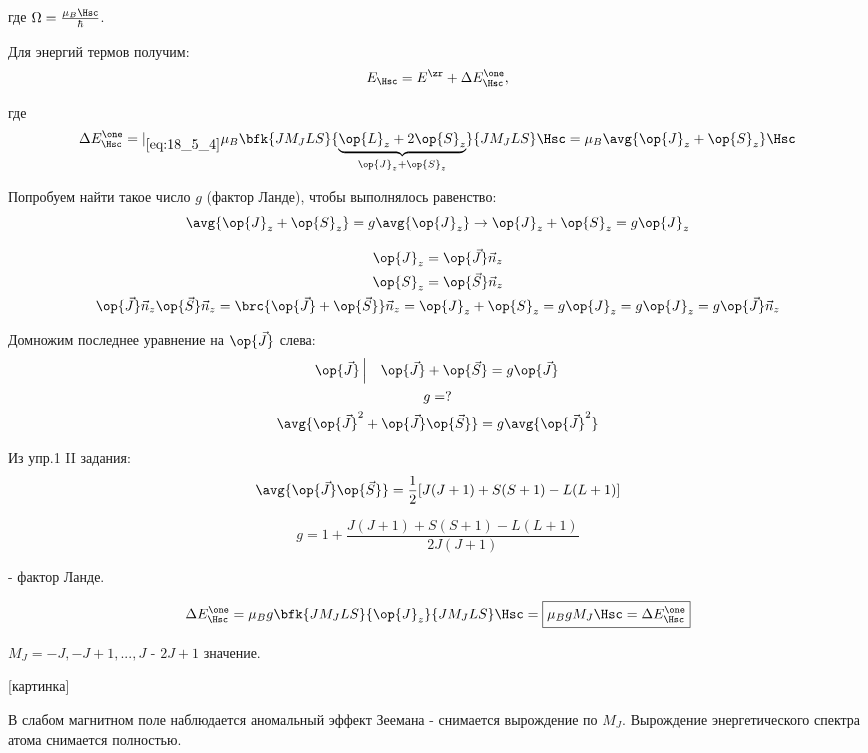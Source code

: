где $\Omega = \frac{\mu_B \Hsc}{\hbar}$.

Для энергий термов получим:
$$
E_{\Hsc} = E^\zr + \Delta E_{\Hsc}^\one,
$$

где 
$$
\Delta E_{\Hsc}^\one =|_{\eqref{eq:18_5_4}} \mu_B \bfk{J M_J L S}{\underbrace{\op{L}_z + 2\op{S}_z}_{\op{J}_z + \op{S}_z}}{J M_J L S} \Hsc  = \mu_B \avg{\op{J}_z + \op{S}_z} \Hsc
$$

Попробуем найти такое число $g$ (фактор Ланде), чтобы выполнялось равенство:
$$
\avg{\op{J}_z + \op{S}_z} = g\avg{\op{J}_z} \to \op{J}_z + \op{S}_z = g\op{J}_z 
$$

\begin{gather*}
\op{J}_z = \op{\vec{J}} \vec{n}_z \\
\op{S}_z = \op{\vec{S}} \vec{n}_z \\
\op{\vec{J}} \vec{n}_z \op{\vec{S}} \vec{n}_z = \brc{\op{\vec{J}} + \op{\vec{S}}}\vec{n}_z = \op{J}_z + \op{S}_z = g \op{J}_z
 = g \op{J}_z = g \op{\vec{J}} \vec{n}_z
\end{gather*}

Домножим последнее уравнение на $\op{\vec{J}}$ слева:
\begin{gather*}
\op{\vec{J}} \left |~~~ \op{\vec{J}} + \op{\vec{S}} = g\op{\vec{J}} \right . \\
g = ? \\
\avg{\op{\vec{J}}^2 + \op{\vec{J}} \op{\vec{S}}} = g \avg{\op{\vec{J}}^2} \\
\end{gather*}

Из упр.1 II задания:
$$
\avg{\op{\vec{J}} \op{\vec{S}}} = \frac{1}{2}[J(J+1) + S(S+1) - L(L + 1)]
$$

\begin{equation}
\label{eq:18_6_3}
\boxed{g = 1 + \frac{J(J+1) + S(S + 1) - L(L + 1)}{2J(J+1)}}
\end{equation}

- фактор Ланде.

\begin{equation}
\label{eq:18_6_4}
\Delta E_{\Hsc}^\one = \mu_B g \bfk{J M_J L S}{\op{J}_z}{J M_J L S} \Hsc = \boxed{\mu_B g M_J \Hsc = \Delta E_{\Hsc}^\one}
\end{equation}

$M_J = -J, -J + 1, ..., J$ - $2J+1$ значение.

[картинка]

В слабом магнитном поле наблюдается аномальный эффект Зеемана - снимается вырождение по $M_J$. Вырождение энергетического спектра атома снимается полностью.

